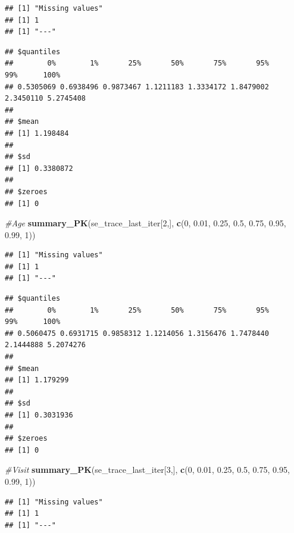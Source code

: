 \documentclass[]{article}
\newenvironment{Shaded}{\begin{snugshade}}{\end{snugshade}}
\newcommand{\CommentTok}[1]{\textcolor[rgb]{0.56,0.35,0.01}{\textit{#1}}}
\newcommand{\DecValTok}[1]{\textcolor[rgb]{0.00,0.00,0.81}{#1}}
\newcommand{\FloatTok}[1]{\textcolor[rgb]{0.00,0.00,0.81}{#1}}
\newcommand{\KeywordTok}[1]{\textcolor[rgb]{0.13,0.29,0.53}{\textbf{#1}}}
\newcommand{\NormalTok}[1]{#1}
\begin{document}
\begin{verbatim}
## [1] "Missing values"
## [1] 1
## [1] "---"
\end{verbatim}

\begin{verbatim}
## $quantiles
##        0%        1%       25%       50%       75%       95%       99%      100% 
## 0.5305069 0.6938496 0.9873467 1.1211183 1.3334172 1.8479002 2.3450110 5.2745408 
## 
## $mean
## [1] 1.198484
## 
## $sd
## [1] 0.3380872
## 
## $zeroes
## [1] 0
\end{verbatim}

\begin{Shaded}
\begin{Highlighting}[]
\CommentTok{#Age}
\KeywordTok{summary_PK}\NormalTok{(se_trace_last_iter[}\DecValTok{2}\NormalTok{,], }\KeywordTok{c}\NormalTok{(}\DecValTok{0}\NormalTok{, }\FloatTok{0.01}\NormalTok{, }\FloatTok{0.25}\NormalTok{, }\FloatTok{0.5}\NormalTok{, }\FloatTok{0.75}\NormalTok{, }\FloatTok{0.95}\NormalTok{, }\FloatTok{0.99}\NormalTok{, }\DecValTok{1}\NormalTok{))}
\end{Highlighting}
\end{Shaded}

\begin{verbatim}
## [1] "Missing values"
## [1] 1
## [1] "---"
\end{verbatim}

\begin{verbatim}
## $quantiles
##        0%        1%       25%       50%       75%       95%       99%      100% 
## 0.5060475 0.6931715 0.9858312 1.1214056 1.3156476 1.7478440 2.1444888 5.2074276 
## 
## $mean
## [1] 1.179299
## 
## $sd
## [1] 0.3031936
## 
## $zeroes
## [1] 0
\end{verbatim}

\begin{Shaded}
\begin{Highlighting}[]
\CommentTok{#Visit}
\KeywordTok{summary_PK}\NormalTok{(se_trace_last_iter[}\DecValTok{3}\NormalTok{,], }\KeywordTok{c}\NormalTok{(}\DecValTok{0}\NormalTok{, }\FloatTok{0.01}\NormalTok{, }\FloatTok{0.25}\NormalTok{, }\FloatTok{0.5}\NormalTok{, }\FloatTok{0.75}\NormalTok{, }\FloatTok{0.95}\NormalTok{, }\FloatTok{0.99}\NormalTok{, }\DecValTok{1}\NormalTok{))}
\end{Highlighting}
\end{Shaded}

\begin{verbatim}
## [1] "Missing values"
## [1] 1
## [1] "---"
\end{verbatim}
\end{document}
